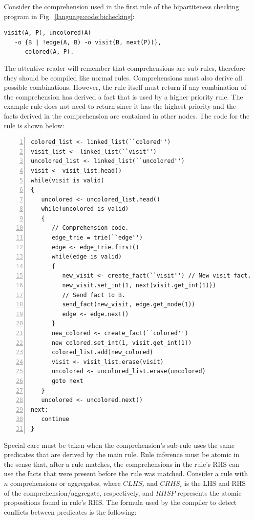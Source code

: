 Consider the comprehension used in the first rule of the bipartiteness checking
program in Fig.~\ref{language:code:bichecking}:

\begin{Verbatim}[fontsize=\codesize]
visit(A, P), uncolored(A)
   -o {B | !edge(A, B) -o visit(B, next(P))},
      colored(A, P).
\end{Verbatim}

The attentive reader will remember that comprehensions are sub-rules, therefore
they should be compiled like normal rules. Comprehensions must also derive all
possible combinations. However, the rule itself must return if any combination
of the comprehension has derived a fact that is used by a higher priority rule.
The example rule does not need to return since it has the highest priority and
the  facts derived in the comprehension are contained in other
nodes. The code for the rule is shown below:

\begin{Verbatim}[numbers=left,fontsize=\codesize]
colored_list <- linked_list(``colored'')
visit_list <- linked_list(``visit'')
uncolored_list <- linked_list(``uncolored'')
visit <- visit_list.head()
while(visit is valid)
{
   uncolored <- uncolored_list.head()
   while(uncolored is valid)
   {
      // Comprehension code.
      edge_trie = trie(``edge'')
      edge <- edge_trie.first()
      while(edge is valid)
      {
         new_visit <- create_fact(``visit'') // New visit fact.
         new_visit.set_int(1, next(visit.get_int(1)))
         // Send fact to B.
         send_fact(new_visit, edge.get_node(1))
         edge <- edge.next()
      }
      new_colored <- create_fact(``colored'')
      new_colored.set_int(1, visit.get_int(1))
      colored_list.add(new_colored)
      visit <- visit_list.erase(visit)
      uncolored <- uncolored_list.erase(uncolored)
      goto next
   }
   uncolored <- uncolored.next()
next:
   continue
}
\end{Verbatim}

Special care must be taken when the comprehension's sub-rule uses the same
predicates that are derived by the main rule. Rule inference must be atomic in
the sense that, after a rule matches, the comprehensions in the rule's RHS can
use the facts that were present before the rule was matched. Consider a rule
with $n$ comprehensions or aggregates, where $CLHS_i$ and $CRHS_i$ is the LHS
and RHS of the comprehension/aggregate, respectively, and $RHSP$ represents the
atomic propositions found in rule's RHS. The formula used by the compiler to
detect conflicts between predicates is the following:

